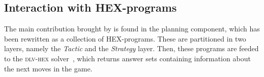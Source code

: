 \subsection{Interaction with HEX-programs}

The main contribution brought by \ah is
found in the planning component, which has
been rewritten as a collection of HEX-programs.
These are partitioned in two layers, namely
the \emph{Tactic} and the \emph{Strategy} layer.
Then, these programs are feeded to the
\textsc{dlv-hex} solver~\cite{dlvHEX},
which returns answer sets containing
information about the next moves in the game.